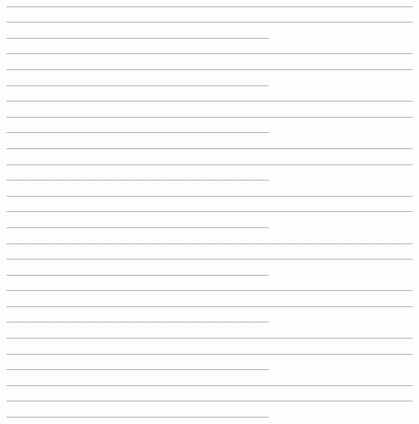\documentclass[12pt]{article}
\begin{document}
\\\_\_\_\_\_\_\_\_\_\_\_\_\_\_\_\_\_\_\_\_\_\_\_\_\_\_\_\_\_\_\_\_\_\_\_\_\_\_\_\_\_\_\_\_\_\_\_\_\_\_\_\_\_\_\_\_\_\_\_\_\_\_\_\_\_\_\_\_\_\_\_\_\_\_\_\_\_\_\_\_\_\_\_\_\_\_\_\_\_\_\_\_\_\_\_\_\_\_\_\_\_\_\_\_\_\_\_\_\_\_\_\_\_\_\_\_\_\_\_\_\_\_\_\_\_\_\_
\\\_\_\_\_\_\_\_\_\_\_\_\_\_\_\_\_\_\_\_\_\_\_\_\_\_\_\_\_\_\_\_\_\_\_\_\_\_\_\_\_\_\_\_\_\_\_\_\_\_\_\_\_\_\_\_\_\_\_\_\_\_\_\_\_\_\_\_\_\_\_\_\_\_\_\_\_\_\_\_\_\_\_\_\_\_\_\_\_\_\_\_\_\_\_\_\_\_\_\_\_\_\_\_\_\_\_\_\_\_\_\_\_\_\_\_\_\_\_\_\_\_\_\_\_\_\_\_
\\\_\_\_\_\_\_\_\_\_\_\_\_\_\_\_\_\_\_\_\_\_\_\_\_\_\_\_\_\_\_\_\_\_\_\_\_\_\_\_\_\_\_\_\_\_\_\_\_\_\_\_\_\_\_\_\_\_\_\_\_\_\_\_\_\_\_\_\_\_\_\_\_\_\_\_\_\_\_\_\_\_\_\_\_\_\_\_\_\_\_\_\_\_\_\_\_\_\_\_\_\_\_\_\_\_\_\_\_\_\_\_\_\_\_\_\_\_\_\_\_\_\_\_\_\_\_\_
\\\_\_\_\_\_\_\_\_\_\_\_\_\_\_\_\_\_\_\_\_\_\_\_\_\_\_\_\_\_\_\_\_\_\_\_\_\_\_\_\_\_\_\_\_\_\_\_\_\_\_\_\_\_\_\_\_\_\_\_\_\_\_\_\_\_\_\_\_\_\_\_\_\_\_\_\_\_\_\_\_\_\_\_\_\_\_\_\_\_\_\_\_\_\_\_\_\_\_\_\_\_\_\_\_\_\_\_\_\_\_\_\_\_\_\_\_\_\_\_\_\_\_\_\_\_\_\_
\\\_\_\_\_\_\_\_\_\_\_\_\_\_\_\_\_\_\_\_\_\_\_\_\_\_\_\_\_\_\_\_\_\_\_\_\_\_\_\_\_\_\_\_\_\_\_\_\_\_\_\_\_\_\_\_\_\_\_\_\_\_\_\_\_\_\_\_\_\_\_\_\_\_\_\_\_\_\_\_\_\_\_\_\_\_\_\_\_\_\_\_\_\_\_\_\_\_\_\_\_\_\_\_\_\_\_\_\_\_\_\_\_\_\_\_\_\_\_\_\_\_\_\_\_\_\_\_
\\\_\_\_\_\_\_\_\_\_\_\_\_\_\_\_\_\_\_\_\_\_\_\_\_\_\_\_\_\_\_\_\_\_\_\_\_\_\_\_\_\_\_\_\_\_\_\_\_\_\_\_\_\_\_\_\_\_\_\_\_\_\_\_\_\_\_\_\_\_\_\_\_\_\_\_\_\_\_\_\_\_\_\_\_\_\_\_\_\_\_\_\_\_\_\_\_\_\_\_\_\_\_\_\_\_\_\_\_\_\_\_\_\_\_\_\_\_\_\_\_\_\_\_\_\_\_\_
\\\_\_\_\_\_\_\_\_\_\_\_\_\_\_\_\_\_\_\_\_\_\_\_\_\_\_\_\_\_\_\_\_\_\_\_\_\_\_\_\_\_\_\_\_\_\_\_\_\_\_\_\_\_\_\_\_\_\_\_\_\_\_\_\_\_\_\_\_\_\_\_\_\_\_\_\_\_\_\_\_\_\_\_\_\_\_\_\_\_\_\_\_\_\_\_\_\_\_\_\_\_\_\_\_\_\_\_\_\_\_\_\_\_\_\_\_\_\_\_\_\_\_\_\_\_\_\_\\
\_\_\_\_\_\_\_\_\_\_\_\_\_\_\_\_\_\_\_\_\_\_\_\_\_\_\_\_\_\_\_\_\_\_\_\_\_\_\_\_\_\_\_\_\_\_\_\_\_\_\_\_\_\_\_\_\_\_\_\_\_\_\_\_\_\_\_\_\_\_\_\_\_\_\_\_\_\_\_\_\_\_\_\_\_\_\_\_\_\_\_\_\_\_\_\_\_\_\_\_\_\_\_\_\_\_\_\_\_\_\_\_\_\_\_\_\_\_\_\_\_\_\_\_\_\_\_\\
\_\_\_\_\_\_\_\_\_\_\_\_\_\_\_\_\_\_\_\_\_\_\_\_\_\_\_\_\_\_\_\_\_\_\_\_\_\_\_\_\_\_\_\_\_\_\_\_\_\_\_\_\_\_\_\_\_\_\_\_\_\_\_\_\_\_\_\_\_\_\_\_\_\_\_\_\_\_\_\_\_\_\_\_\_\_\_\_\_\_\_\_\_\_\_\_\_\_\_\_\_\_\_\_\_\_\_\_\_\_\_\_\_\_\_\_\_\_\_\_\_\_\_\_\_\_\_\\
\end{document}
